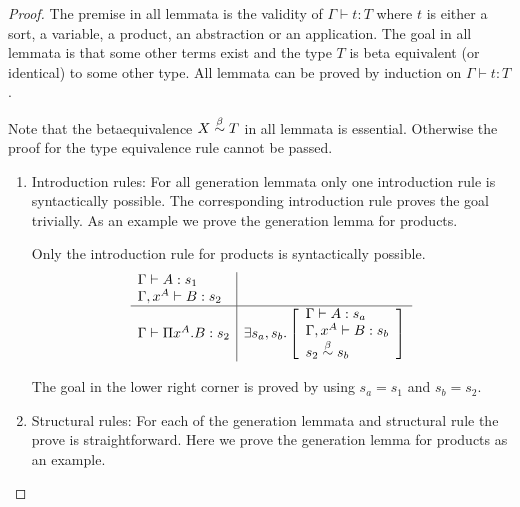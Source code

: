\begin{theorem}
    \begin{proof}
        The premise in all lemmata is the validity of $\Gamma \vdash t : T$
        where $t$ is either a sort, a variable, a product, an abstraction or an
        application. The goal in all lemmata is that some other terms exist and
        the type $T$ is beta equivalent (or identical) to some other type. All
        lemmata can be proved by induction on $\Gamma \vdash t : T$.

        Note that the betaequivalence $ X \stackrel{\beta}{\sim} T$ in all lemmata is
        essential. Otherwise the proof for the type equivalence rule cannot be
        passed.

        \begin{enumerate}
        \item Introduction rules: For all generation lemmata only one
            introduction rule is syntactically possible. The corresponding
                introduction rule proves the goal trivially. As an example we
                prove the generation lemma for products.

                Only the introduction rule for products is syntactically
                possible.
                $$
                \begin{array}{l|l}
                    \Gamma \vdash A: s_1
                    \\
                    \Gamma, x^A \vdash B: s_2
                    \\
                    \hline
                    \Gamma \vdash \Pi x^A. B : s_2
                    &
                    \exists s_a, s_b.
                    \left[
                    \begin{array}{l}
                        \Gamma \vdash A : s_a
                        \\
                        \Gamma, x^A \vdash B : s_b
                        \\
                        s_2 \stackrel{\beta}{\sim} s_b
                    \end{array}
                    \right]
                \end{array}
                $$

                The goal in the lower right corner is proved by using $s_a =
                    s_1$ and $s_b = s_2$.

        \item Structural rules: For each of the generation lemmata and
            structural rule the prove is straightforward. Here we prove the
                generation lemma for products as an example.


\end{enumerate}
\end{proof}
\end{theorem}
